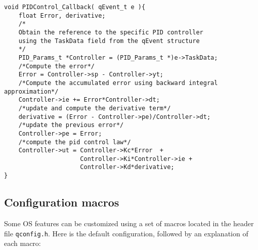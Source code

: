 \begin{lstlisting}[style=CStyle]
void PIDControl_Callback( qEvent_t e ){
    float Error, derivative;
    /* 
    Obtain the reference to the specific PID controller 
    using the TaskData field from the qEvent structure
    */
    PID_Params_t *Controller = (PID_Params_t *)e->TaskData; 
    /*Compute the error*/
    Error = Controller->sp - Controller->yt;
    /*Compute the accumulated error using backward integral approximation*/
    Controller->ie += Error*Controller->dt;
    /*update and compute the derivative term*/
    derivative = (Error - Controller->pe)/Controller->dt;
    /*update the previous error*/
    Controller->pe = Error;
    /*compute the pid control law*/
    Controller->ut = Controller->Kc*Error  +  
                     Controller->Ki*Controller->ie + 
                     Controller->Kd*derivative;
}
\end{lstlisting}

\newpage

\subsection{Configuration macros}
Some  OS features can be customized using a set of macros located in the header file \lstinline{qconfig.h}. Here is the default configuration, followed by an explanation of each macro: \\

